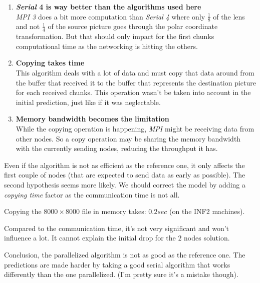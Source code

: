 \documentclass[10pt,a4paper]{article}
\begin{document}
\begin{enumerate}
    \item \textbf{\emph{Serial} 4 is way better than the algorithms used here}  \\

    \emph{MPI 3} does a bit more computation than \emph{Serial 4} where only
    $\frac{1}{8}$ of the lens and not $\frac{1}{4}$ of the source picture goes
    through the polar coordinate transformation. But that should only impact
    for the first chunks computational time as the networking is hitting the
    others.

    \item \textbf{Copying takes time} \\

    This algorithm deals with a lot of data and must copy that data around from
    the buffer that received it to the buffer that represents the destination
    picture for each received chunks. This operation wasn't be taken into
    account in the initial prediction, just like if it was neglectable.

    \item \textbf{Memory bandwidth becomes the limitation} \\

    While the copying operation is happening, \emph{MPI} might be receiving
    data from other nodes. So a copy operation may be sharing the memory
    bandwidth with the currently sending nodes, reducing the throughput it has.

\end{enumerate}

Even if the algorithm is not as efficient as the reference one, it only affects
the first couple of nodes (that are expected to send data as early as possible).
The second hypothesis seems more likely. We should correct the model by adding
a \emph{copying time} factor as the communication time is not all.

Copying the $8000 \times 8000$ file in memory takes: $0.2 sec$ (on the INF2
machines).

Compared to the communication time, it's not very significant and won't
influence a lot. It cannot explain the initial drop for the $2$ nodes solution.

Conclusion, the parallelized algorithm is not as good as the reference one.
The predictions are made harder by taking a good serial algorithm that works
differently than the one parallelized. (I'm pretty sure it's a mistake though).
\end{document}
